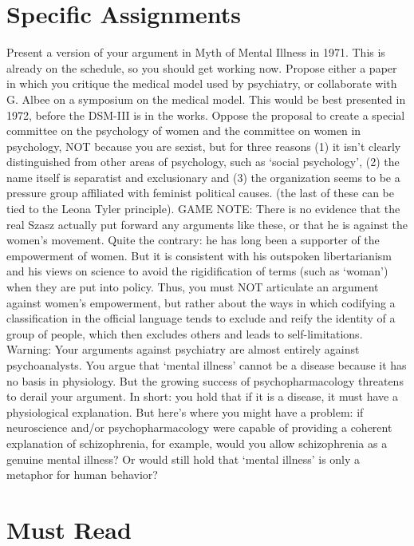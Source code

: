 \section{Specific Assignments}
\label{specificassignments}

Present a version of your argument in Myth of Mental Illness in 1971. This is already on the schedule, so you should get working now.
Propose either a paper in which you critique the medical model used by psychiatry, or collaborate with G. Albee on a symposium on the medical model. This would be best presented in 1972, before the DSM-III is in the works.
Oppose the proposal to create a special committee on the psychology of women and the committee on women in psychology, NOT because you are sexist, but for three reasons (1) it isn't clearly distinguished from other areas of psychology, such as `social psychology', (2) the name itself is separatist and exclusionary and (3) the organization seems to be a pressure group affiliated with feminist political causes. (the last of these can be tied to the Leona Tyler principle). GAME NOTE: There is no evidence that the real Szasz actually put forward any arguments like these, or that he is against the women's movement. Quite the contrary: he has long been a supporter of the empowerment of women. But it is consistent with his outspoken libertarianism and his views on science to avoid the rigidification of terms (such as `woman') when they are put into policy. Thus, you must NOT articulate an argument against women's empowerment, but rather about the ways in which codifying a classification in the official language tends to exclude and reify the identity of a group of people, which then excludes others and leads to self-limitations.
Warning: Your arguments against psychiatry are almost entirely against psychoanalysts. You argue that ‘mental illness’ cannot be a disease because it has no basis in physiology. But the growing success of psychopharmacology threatens to derail your argument. In short: you hold that if it is a disease, it must have a physiological explanation. But here’s where you might have a problem: if neuroscience and\slash or psychopharmacology were capable of providing a coherent explanation of schizophrenia, for example, would you allow schizophrenia as a genuine mental illness? Or would still hold that ‘mental illness’ is only a metaphor for human behavior?

\section{Must Read}
\label{mustread}

